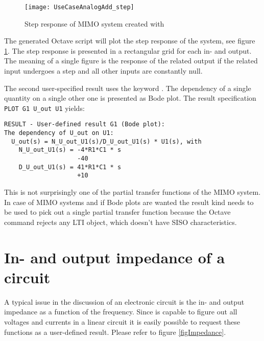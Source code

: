 \begin{figure}
\begin{center}
\texttt{[image: UseCaseAnalogAdd\_step]}
\caption{Step response of MIMO system created with }
\label{figUseCaseAnalogAdd_step}
\end{center}
\end{figure}

The generated Octave script  will plot the step response of
the system, see figure \ref{figUseCaseAnalogAdd_step}. The step response is
presented in a rectangular grid for each in- and output. The meaning of a
single figure is the response of the related output if the related input
undergoes a step and all other inputs are constantly null.

The second user-specified result uses the keyword . The
dependency of a single quantity on a single other one is presented as Bode
plot. The result specification \verb+PLOT G1 U_out U1+ yields:
\begin{verbatim}
RESULT - User-defined result G1 (Bode plot):
The dependency of U_out on U1:
  U_out(s) = N_U_out_U1(s)/D_U_out_U1(s) * U1(s), with
    N_U_out_U1(s) = -4*R1*C1 * s
                    -40
    D_U_out_U1(s) = 41*R1*C1 * s
                    +10
\end{verbatim}

\noindent This is not surprisingly one of the partial transfer functions
of the MIMO system. In case of MIMO systems and if Bode plots are wanted
the result kind  needs to be used to pick out a single partial
transfer function because the Octave command  rejects any LTI
object, which doesn't have SISO characteristics.


\section{In- and output impedance of a circuit}

A typical issue in the discussion of an electronic circuit is the in- and
output impedance as a function of the frequency. Since \linnet{} is
capable to figure out all voltages and currents in a linear circuit it is
easily possible to request these functions as a user-defined result.
Please refer to figure \ref{figImpedance}.

